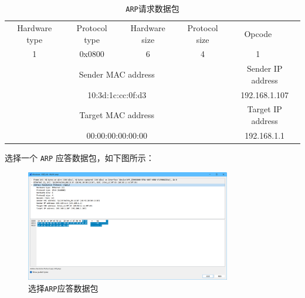 \documentclass{article}
\begin{document}
\begin{enumerate}[noitemsep]
        \begin{table}[H]
          \centering
          \begin{tabularx}{0.78\textwidth}{|*{10}{X|}}
            \hline
            \multicolumn{2}{|c|}{Hardware type}      & \multicolumn{2}{c|}{Protocol type}     & \multicolumn{1}{c|}{Hardware size} & \multicolumn{1}{c|}{Protocol size} & \multicolumn{2}{c|}{Opcode} & \multicolumn{2}{c|}{} \\
            \multicolumn{2}{|c|}{1}                  & \multicolumn{2}{c|}{0x0800}            & \multicolumn{1}{c|}{6}             & \multicolumn{1}{c|}{4}             & \multicolumn{2}{c|}{1}      & \multicolumn{2}{c|}{} \\
            \hline
            \multicolumn{6}{|c|}{Sender MAC address} & \multicolumn{4}{c|}{Sender IP address}                                                                                                                                 \\
            \multicolumn{6}{|c|}{10:3d:1c:cc:0f:d3}  & \multicolumn{4}{c|}{192.168.1.107}                                                                                                                                     \\
            \hline
            \multicolumn{6}{|c|}{Target MAC address} & \multicolumn{4}{c|}{Target IP address}                                                                                                                                 \\
            \multicolumn{6}{|c|}{00:00:00:00:00:00}  & \multicolumn{4}{c|}{192.168.1.1}                                                                                                                                       \\
            \hline
          \end{tabularx}
          \caption{\texttt{ARP}请求数据包}
        \end{table}

        选择一个 \texttt{ARP} 应答数据包，如下图所示：

        \begin{figure}[H]
          \centering
          \includegraphics[width=0.8\textwidth]{img/7.png}
          \caption{选择\texttt{ARP}应答数据包}
          \label{fig:7}
        \end{figure}


\end{enumerate}
\end{document}
